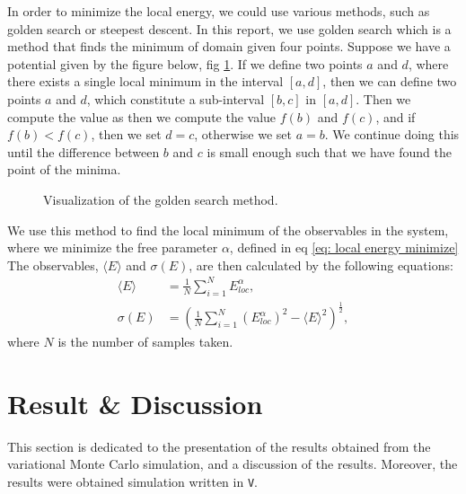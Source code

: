 \documentclass[a4paper]{article}
\newcommand{\newparagraph}{\vspace{.5cm}\noindent}
\newcommand{\average}[1]{\langle #1 \rangle}
\begin{document}
\newparagraph
In order to minimize the local energy, we could use various methods, such as golden search or steepest descent.
In this report, we use golden search which is a method that finds the minimum of domain given four points. Suppose we have a potential given by the figure below, fig \ref{fig: golden search}.
If we define two points $a$ and $d$, where there exists a single local minimum in the interval $[a, d]$, then we can define two points $a$ and $d$, which constitute a sub-interval $[b,c]$ in $[a,d]$.
Then we compute the value as then we compute the value $f(b)$ and $f(c)$, and if $f(b) < f(c)$, then we set $d = c$, otherwise we set $a = b$.
We continue doing this until the difference between $b$ and $c$ is small enough such that we have found the point of the minima.
\begin{figure}[H]
    \centering
    \caption{Visualization of the golden search method.}
    \label{fig: golden search}
\end{figure}\noindent
We use this method to find the local minimum of the observables in the system, where we minimize the free parameter $\alpha$, defined in eq \eqref{eq: local energy minimize}
The observables, $\average{E}$ and $\sigma(E)$, are then calculated by the following equations:
\begin{align}
    \average{E} &= \frac{1}{N}\sum_{i = 1}^N E_{loc}^\alpha, \label{eq: average energy}\\
    \sigma(E) &= \left(\frac{1}{N}\sum_{i = 1}^N \left(E_{loc}^\alpha\right)^2 - \average{E}^2\right)^{\frac{1}{2}},\label{eq: variance energy}
\end{align}where $N$ is the number of samples taken.
\newpage
\section{Result \& Discussion}
This section is dedicated to the presentation of the results obtained from the variational Monte Carlo simulation, and a discussion of the results.
Moreover, the results were obtained simulation written in \verb|V|.
\end{document}
